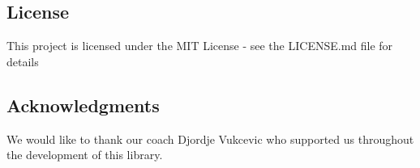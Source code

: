 \subsection*{License}

This project is licensed under the M\+IT License -\/ see the L\+I\+C\+E\+N\+SE.md file for details

\subsection*{Acknowledgments}


\begin{DoxyItemize}
\item We would like to thank our coach Djordje Vukcevic who supported us throughout the development of this library. 
\end{DoxyItemize}
